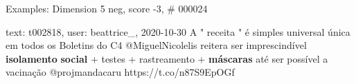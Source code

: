 \begin{frame}{Examples: Dimension 5 neg, score -3, \# 000024}
\footnotesize
\begin{alertblock}{text: t002818, user: beattrice\_, 2020-10-30}
A " receita " é simples universal única em todos os Boletins do C4 
@MiguelNicolelis reitera ser imprescindível \textbf{isolamento} \textbf{social} 
+ testes + rastreamento + \textbf{máscaras} até ser possível a vacinação 
@projmandacaru https://t.co/n87S9EpOGf 
\end{alertblock}
\end{frame}

